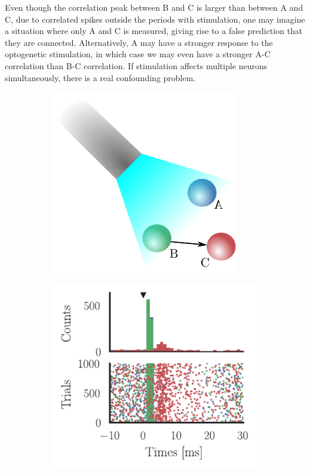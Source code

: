 \documentclass[11pt]{article}
\begin{document}
Even though the correlation peak between B and C is larger than between A and C, due to correlated spikes outside the periods with stimulation, one may imagine a situation where only A and C is measured, giving rise to a false prediction that they are connected. 
Alternatively, A may have a stronger response to the optogenetic stimulation, in which case we may even have a stronger A-C correlation than B-C correlation.  
If stimulation affects multiple neurons simultaneously, there is a real confounding problem.

\begin{figure} 
\makeatletter
\renewcommand\p@subfigure{}
\makeatother
\begin{subfigure}{0.485\textwidth} \includegraphics[scale=1]{simple}
\caption{} \label{fig:intro:1}
\end{subfigure}\hfill
\begin{subfigure}{0.485\textwidth} \includegraphics[scale=1]{psth_triple}
\caption{} \label{fig:intro:2}
\end{subfigure}\\

\end{figure}
\end{document}
